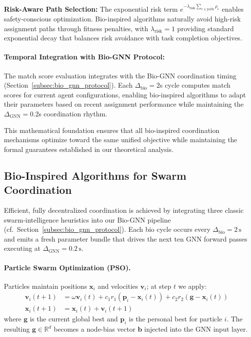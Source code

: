 \documentclass{article}
\begin{document}
\textbf{Risk-Aware Path Selection:} The exponential risk term $e^{-\lambda_{\text{risk}} \sum_{e \in \text{path}} \rho_e}$ enables safety-conscious optimization. Bio-inspired algorithms naturally avoid high-risk assignment paths through fitness penalties, with $\lambda_{\text{risk}} = 1$ providing standard exponential decay that balances risk avoidance with task completion objectives.

\paragraph{Temporal Integration with Bio-GNN Protocol:} The match score evaluation integrates with the Bio-GNN coordination timing (Section~\ref{subsec:bio_gnn_protocol}). Each $\Delta_{\text{bio}} = 2$s cycle computes match scores for current agent configurations, enabling bio-inspired algorithms to adapt their parameters based on recent assignment performance while maintaining the $\Delta_{\text{GNN}} = 0.2$s coordination rhythm.

This mathematical foundation ensures that all bio-inspired coordination mechanisms optimize toward the same unified objective while maintaining the formal guarantees established in our theoretical analysis.

\subsection{Bio-Inspired Algorithms for Swarm Coordination}
\label{subsec:bio_algorithms}

Efficient, fully decentralized coordination is achieved by integrating three classic swarm-intelligence heuristics into our Bio-GNN pipeline (cf.\ Section~\ref{subsec:bio_gnn_protocol}). Each bio cycle occurs every $\Delta_{\text{bio}}=2\,\text{s}$ and emits a fresh parameter bundle that drives the next ten GNN forward passes executing at $\Delta_{\text{GNN}}=0.2\,\text{s}$.

\paragraph{Particle Swarm Optimization (PSO).}
Particles maintain positions $\mathbf{x}_i$ and velocities $\mathbf{v}_i$; at step $t$ we apply:
\begin{align}
\mathbf{v}_i(t{+}1) &= \omega\mathbf{v}_i(t) + c_1 r_1(\mathbf{p}_i-\mathbf{x}_i(t)) + c_2 r_2(\mathbf{g}-\mathbf{x}_i(t)) \\
\mathbf{x}_i(t{+}1) &= \mathbf{x}_i(t) + \mathbf{v}_i(t{+}1)
\end{align}
where $\mathbf{g}$ is the current global best and $\mathbf{p}_i$ is the personal best for particle $i$. The resulting $\mathbf{g} \in \mathbb{R}^d$ becomes a node-bias vector $\mathbf{b}$ injected into the GNN input layer.
\end{document}
